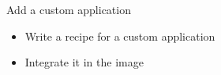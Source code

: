 \setuplabframe
{Add a custom application}
{
  \begin{itemize}
    \item Write a recipe for a custom application
    \item Integrate it in the image
  \end{itemize}
}
